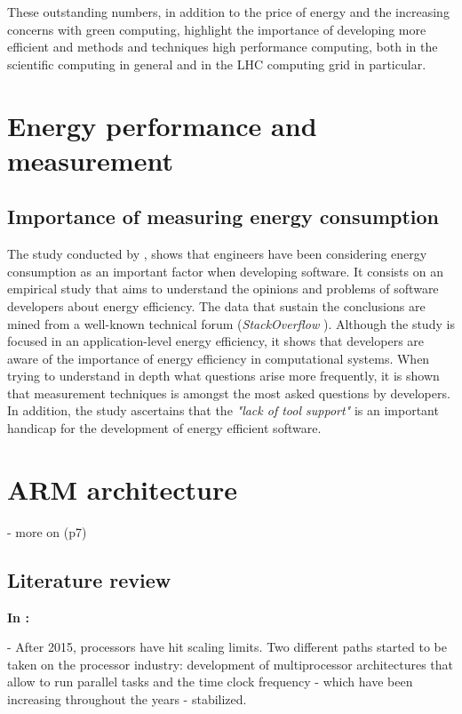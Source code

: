 These outstanding numbers, in addition to the price of energy and the increasing
concerns with green computing, highlight the importance of
developing more efficient and methods and techniques high performance computing,
both in the scientific computing in general and in the LHC computing grid in
particular. 


\section{Energy performance and measurement}
\subsection{Importance of measuring energy consumption}

The study conducted by \cite{QUESTIONS_ENERGY}, shows that engineers have been
considering energy consumption as an important factor when developing software.
It consists on an empirical study that aims to understand the opinions and
problems of software developers about energy efficiency. The data that sustain
the conclusions are  mined from
a well-known technical forum (\textit{StackOverflow} \cite{STACKOVERFLOW}).
Although the study is focused in an application-level energy efficiency, it
shows that developers are aware of the importance of energy efficiency in 
computational systems. When trying to understand in depth what questions arise 
more frequently, it is shown that measurement techniques is amongst the most
asked questions by developers. In addition, the study ascertains that the 
\textit{"lack of tool support"} is an important handicap for the development of 
energy efficient software.



\section{ARM architecture}

- more on (p7)

\subsection{Literature review}

\textbf{In \cite{ACAT13ARM}:}

- After 2015, processors have hit scaling limits. Two different paths started to be
taken on the processor industry:  development of multiprocessor architectures that
allow to run parallel tasks and the time clock frequency - which have been
increasing throughout the years - stabilized.

